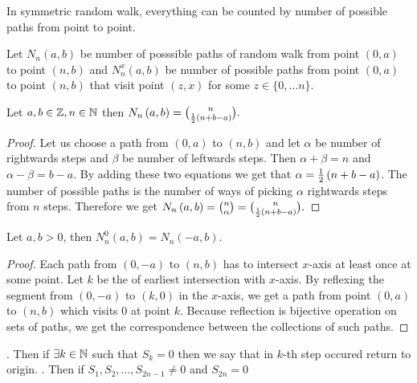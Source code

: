 \begin{rem}
 In symmetric random walk, everything can be counted by number of possible paths from point to point.
\end{rem}

\begin{defn}\label{defn-number_possible_paths}
 Let $N_n \left( a,b \right) $ be number of posssible paths of random walk \rw from point $ \left( 0,a \right) $ to point $ \left( n,b \right) $
 and $N_n^x \left( a,b \right) $ be number of possible paths from point $ \left( 0,a \right) $ to point $ \left( n,b \right) $
 that visit point $ \left( z,x \right) $ for some $z \in \{0, \ldots n \}$.
\end{defn}
\begin{thm}\label{thm-number_of_possible_paths}
 Let $a,b \in \mathbb{Z}, n \in \mathbb{N}$ then $N_n \left( a,b \right) =\binom{n}{\frac{1}{2} \left( n+b-a \right) }.$
\end{thm}
\begin{proof}
 Let us choose a path from $ \left( 0,a \right) $ to $ \left( n,b \right) $ and let $\alpha$ be number of rightwards steps and $\beta$ be number of leftwards steps.
 Then $\alpha+\beta=n$ and $\alpha-\beta=b-a$. By adding these two equations we get that $\alpha=\frac{1}{2} \left( n+b-a \right) $.
 The number of possible paths is the number of ways of picking $\alpha$ rightwards steps from $n$ steps.
 Therefore we get $N_n \left( a,b \right) =\binom{n}{\alpha}=\binom{n}{\frac{1}{2} \left( n+b-a \right) }.$
\end{proof}
\begin{thm}\label{thm-reflection_principle}
 Let $a,b >0$, then $N_n^0 \left( a,b \right) =N_n \left( -a,b \right) $.
\end{thm}
\begin{proof}
 Each path from $ \left( 0,-a \right) $ to $ \left( n,b \right) $ has to intersect $x$-axis at least once at some point.
 Let $k$ be the \Time of earliest intersection with $x$-axis. By reflexing the segment from $ \left( 0,-a \right) $ to $ \left( k,0 \right) $ in the $x$-axis,
 we get a path from point $ \left( 0,a \right) $ to $ \left( n,b \right) $ which visits $0$ at point $k$.
 Because reflection is bijective operation on sets of paths, we get the correspondence between the collections of such paths.
\end{proof}
\begin{defn}\label{defn-return_origin1}
 \Lrw. Then if $\exists k \in \mathbb{N}$ such that $S_k=0$ then we say that in $k$-th step occured return to origin.
 \Lrw. Then if $S_1,S_2, \ldots, S_{2n-1}\neq 0$ and $S_{2n}=0$
\end{defn}
